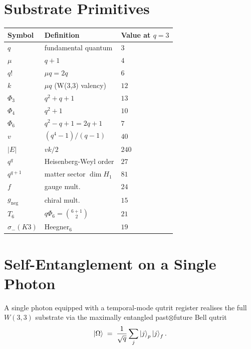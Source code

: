 \documentclass[11pt]{article}
\begin{document}
\section{Substrate Primitives}

\begin{center}\small\begin{tabular}{lll}
\toprule
\textbf{Symbol} & \textbf{Definition} & \textbf{Value at $q=3$} \\
\midrule
$q$        & fundamental quantum                & $3$ \\
$\mu$      & $q+1$                               & $4$ \\
$q!$       & $\mu q = 2q$                       & $6$ \\
$k$        & $\mu q$ (W(3,3) valency)            & $12$ \\
$\Phi_3$   & $q^2+q+1$                            & $13$ \\
$\Phi_4$   & $q^2+1$                              & $10$ \\
$\Phi_6$   & $q^2-q+1 = 2q+1$                    & $7$ \\
$v$        & $(q^4-1)/(q-1)$                      & $40$ \\
$|E|$      & $vk/2$                              & $240$ \\
$q^q$      & Heisenberg-Weyl order               & $27$ \\
$q^{q+1}$  & matter sector $\dim H_1$             & $81$ \\
$f$        & gauge mult.                          & $24$ \\
$g_{\mathrm{neg}}$ & chiral mult.                  & $15$ \\
$T_6$      & $q\Phi_6 = \binom{6+1}{2}$         & $21$ \\
$\sigma_{-}(K3)$ & Heegner$_6$                    & $19$ \\
\bottomrule
\end{tabular}\end{center}

\section{Self-Entanglement on a Single Photon}

A single photon equipped with a temporal-mode qutrit register
realises the full $W(3,3)$ substrate via the maximally entangled
past$\otimes$future Bell qutrit
\[
  \ket{\Omega} \;=\; \frac{1}{\sqrt q}\sum_j \ket{j}_p \ket{j}_f.
\]
\end{document}
